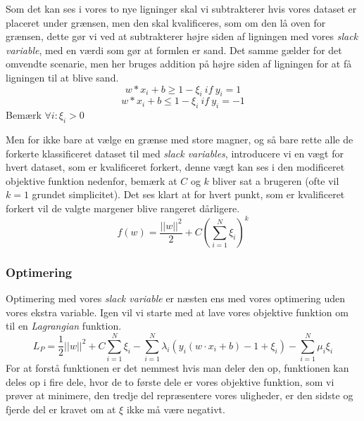 \documentclass{article}
\begin{document}
 Som det kan ses i vores to nye ligninger skal vi subtrakterer hvis vores dataset er placeret under grænsen, men den skal kvalificeres, som om den lå oven for grænsen, dette gør vi ved at subtrakterer højre siden af ligningen med vores \textit{slack variable}, med en værdi som gør at formlen er sand. Det samme gælder for det omvendte scenarie, men her bruges addition på højre siden af ligningen for at få ligningen til at blive sand.  
$$w * x_i + b \geq 1 - \xi_i \ if \ y_i = 1$$
$$w * x_i + b \leq 1 - \xi_i \ if \ y_i = -1$$
Bemærk $\forall i : \xi_i > 0$

Men for ikke bare at vælge en grænse med store magner, og så bare rette alle de forkerte klassificeret dataset til med \textit{slack variables}, introducere vi en vægt for hvert dataset, som er kvalificeret forkert, denne vægt kan ses i den modificeret objektive funktion nedenfor, bemærk at $C$ og $k$ bliver sat a brugeren (ofte vil $k = 1$ grundet simplicitet). Det ses klart at for hvert punkt, som er kvalificeret forkert vil de valgte margener blive rangeret dårligere. 
$$f(w) = \frac{||w||^2}{2}+C(\sum\limits_{i=1}^N \xi_i)^k$$

\subsubsection{Optimering}
Optimering med vores \textit{slack variable} er næsten ens med vores optimering uden vores ekstra variable. Igen vil vi starte med at lave vores objektive funktion om til en \textit{Lagrangian} funktion.
$$L_P = \frac{1}{2}||w||^2 + C \sum\limits_{i=1}^N \xi_i - \sum\limits_{i=1}^N \lambda_i (y_i(w \cdot x_i + b) - 1 + \xi_i) - \sum\limits_{i=1}^N \mu_i \xi_i$$
For at forstå funktionen er det nemmest hvis man deler den op, funktionen kan deles op i fire dele, hvor de to første dele er vores objektive funktion, som vi prøver at minimere, den tredje del  repræsentere vores uligheder, er den sidste og fjerde del er kravet om at $\xi$ ikke må være negativt. 
\end{document}
